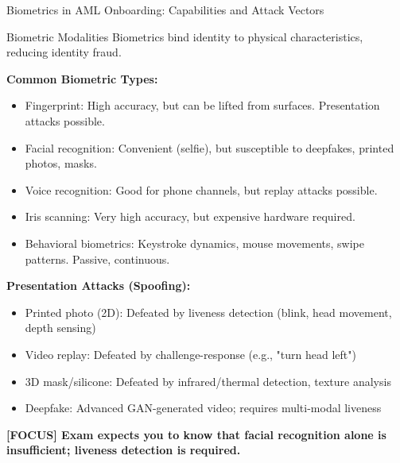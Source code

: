 \documentclass[11pt,a4paper]{beamer}
\newcommand{\examfocus}[1]{\textcolor{orange!80!black}{\textbf{[FOCUS] #1}}}
\begin{document}
\begin{frame}{Biometrics in AML Onboarding: Capabilities and Attack Vectors}
	\begin{block}{Biometric Modalities}
		Biometrics bind identity to physical characteristics, reducing identity fraud.
	\end{block}
	\textbf{Common Biometric Types:}
	\begin{itemize}
		\item Fingerprint: High accuracy, but can be lifted from surfaces. Presentation attacks possible.
		\item Facial recognition: Convenient (selfie), but susceptible to deepfakes, printed photos, masks.
		\item Voice recognition: Good for phone channels, but replay attacks possible.
		\item Iris scanning: Very high accuracy, but expensive hardware required.
		\item Behavioral biometrics: Keystroke dynamics, mouse movements, swipe patterns. Passive, continuous.
	\end{itemize}
	\textbf{Presentation Attacks (Spoofing):}
	\begin{itemize}
		\item Printed photo (2D): Defeated by liveness detection (blink, head movement, depth sensing)
		\item Video replay: Defeated by challenge-response (e.g., "turn head left")
		\item 3D mask/silicone: Defeated by infrared/thermal detection, texture analysis
		\item Deepfake: Advanced GAN-generated video; requires multi-modal liveness
	\end{itemize}
	\examfocus{Exam expects you to know that facial recognition alone is insufficient; liveness detection is required.}
\end{frame}
\end{document}
